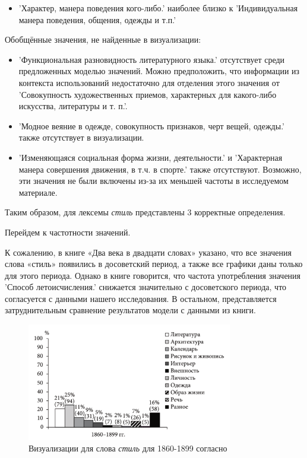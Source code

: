 \begin{itemize}
    \item ’Характер, манера поведения кого-либо.’ наиболее близко к
’Индивидуальная манера поведения, общения, одежды и т.п.’
\end{itemize}

Обобщённые значения, не найденные в визуализации:
\begin{itemize}
    \item ’Функциональная разновидность литературного языка.’ отсутствует среди предложенных моделью значений.
Можно предположить, что информации из контекста использований недостаточно для отделения этого значения от ’Совокупность художественных приемов, характерных для какого-либо искусства, литературы и т. п.’.

    \item ’Модное веяние в одежде, совокупность признаков, черт вещей, одежды.’ также отсутствует в визуализации.

    \item ’Изменяющаяся социальная форма жизни, деятельности.’ и ’Характерная манера совершения движения, в т.ч. в спорте.’ также отсутствуют.
Возможно, эти значения не были включены из-за их меньшей частоты в исследуемом материале.
\end{itemize}

Таким образом, для лексемы \textit{стиль} представлены 3 корректные определения.

Перейдем к частотности значений.

К сожалению, в книге «Два века в двадцати словах» указано,
что все значения слова «стиль» появились в досоветский период,
а также все графики даны только для этого периода.
Однако в книге говорится, что частота употребления значения ’Способ летоисчисления.’
снижается значительно с досоветского периода, что согласуется с данными нашего исследования.
В остальном, представляется затруднительным сравнение результатов модели с данными из книги.

\begin{figure}[H]
    \centering %
    \includegraphics[width=0.8\textwidth]{img/book/stil'/1860-1899}
    \caption{Визуализации для слова \textit{стиль} для 1860-1899 согласно~\cite{TwoCenturies}}
    \label{fig:Стиль}
\end{figure}


